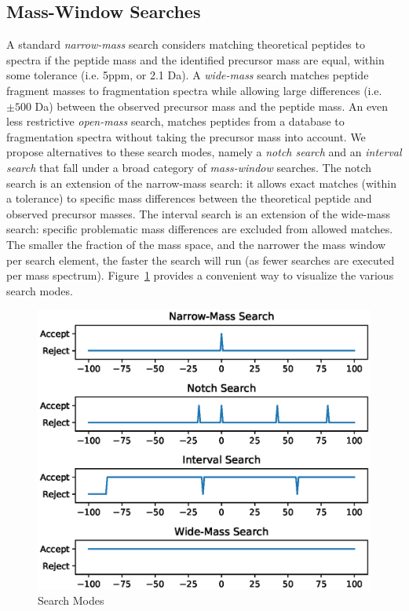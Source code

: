 \documentclass[journal=jprobs,manuscript=article]{achemso}
\begin{document}
\subsection{Mass-Window Searches}
A standard \textit{narrow-mass} search considers matching theoretical peptides to spectra if the peptide mass and the identified precursor mass are equal, within some tolerance (i.e. 5ppm, or 2.1 Da).
A \textit{wide-mass} search matches peptide fragment masses to fragmentation spectra while allowing large differences (i.e. $\pm 500$ Da) between the observed precursor mass and the peptide mass.
An even less restrictive \textit{open-mass} search, matches peptides from a database to fragmentation spectra without taking the precursor mass into account.
We propose alternatives to these search modes, namely a \textit{notch search} and an \textit{interval search} that fall under a broad category of \textit{mass-window} searches.
The notch search is an extension of the narrow-mass search: it allows exact matches (within a tolerance) to specific mass differences between the theoretical peptide and observed precursor masses.
The interval search is an extension of the wide-mass search: specific problematic mass differences are excluded from allowed matches.
The smaller the fraction of the mass space, and the narrower the mass window per search element, the faster the search will run (as fewer searches are executed per mass spectrum).
Figure~\ref{fgr:differentSearchModes} provides a convenient way to visualize the various search modes.

\begin{figure}
  \includegraphics{figureDifferentSearchModes.eps}
  \caption{Search Modes}
  \label{fgr:differentSearchModes}
\end{figure}
\end{document}
